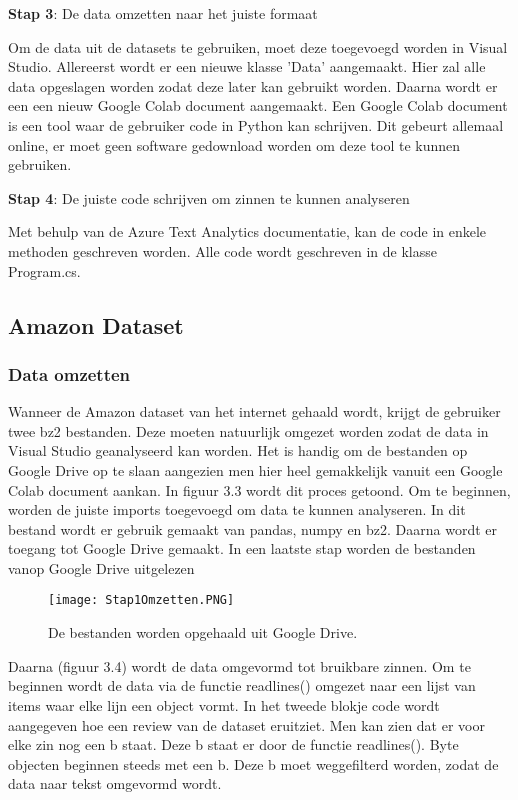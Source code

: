 \textbf{Stap 3}: De data omzetten naar het juiste formaat

Om de data uit de datasets te gebruiken, moet deze toegevoegd worden in Visual Studio. Allereerst wordt er een nieuwe klasse 'Data' aangemaakt. Hier zal alle data opgeslagen worden zodat deze later kan gebruikt worden. Daarna wordt er een een nieuw Google Colab document aangemaakt. Een Google Colab document is een tool waar de gebruiker code in Python kan schrijven. Dit gebeurt allemaal online, er moet geen software gedownload worden om deze tool te kunnen gebruiken. 

\textbf{Stap 4}: De juiste code schrijven om zinnen te kunnen analyseren

Met behulp van de Azure Text Analytics documentatie, kan de code in enkele methoden geschreven worden. Alle code wordt geschreven in de klasse Program.cs. 

\subsection{Amazon Dataset}
\label{amazondatasetazure}

\subsubsection{Data omzetten}
\label{amazondatasetomzettenazure}
Wanneer de Amazon dataset van het internet gehaald wordt, krijgt de gebruiker twee bz2 bestanden. Deze moeten natuurlijk omgezet worden zodat de data in Visual Studio geanalyseerd kan worden. Het is handig om de bestanden op Google Drive op te slaan aangezien men hier heel gemakkelijk vanuit een Google Colab document aankan. In figuur 3.3 wordt dit proces getoond. Om te beginnen, worden de juiste imports toegevoegd om data te kunnen analyseren. In dit bestand wordt er gebruik gemaakt van pandas, numpy en bz2. Daarna wordt er toegang tot Google Drive gemaakt. In een laatste stap worden de bestanden vanop Google Drive uitgelezen

\begin{figure}[!htbp]
    \texttt{[image: Stap1Omzetten.PNG]}
    \caption{\label{stap1amazon}De bestanden worden opgehaald uit Google Drive.}
\end{figure}
\FloatBarrier

Daarna (figuur 3.4) wordt de data omgevormd tot bruikbare zinnen. Om te beginnen wordt de data via de functie readlines() omgezet naar een lijst van items waar elke lijn een object vormt. In het tweede blokje code wordt aangegeven hoe een review van de dataset eruitziet. Men kan zien dat er voor elke zin nog een b staat. Deze b staat er door de functie readlines(). Byte objecten beginnen steeds met een b. Deze b moet weggefilterd worden, zodat de data naar tekst omgevormd wordt. 

